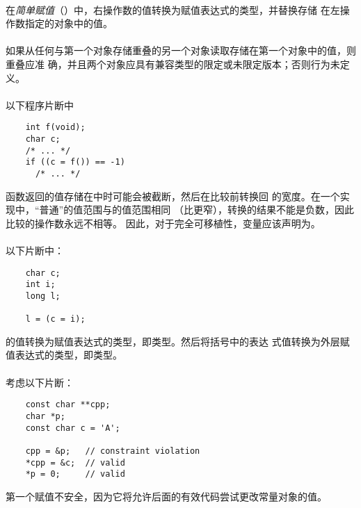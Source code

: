 \semantic
\paragraph{}
在\textit{简单赋值}（\tm{=}）中，右操作数的值转换为赋值表达式的类型，并替换存储
在左操作数指定的对象中的值。

\paragraph{}
如果从任何与第一个对象存储重叠的另一个对象读取存储在第一个对象中的值，则重叠应准
确，并且两个对象应具有兼容类型的限定或未限定版本；否则行为未定义。

\paragraph{}
\ex 以下程序片断中
\begin{lstlisting}
    int f(void);
    char c;
    /* ... */
    if ((c = f()) == -1)
      /* ... */
\end{lstlisting}
函数返回的值存储在中时可能会被截断，然后在比较前转换回
的宽度。在一个实现中，``普通''的值范围与的值范围相同
（比更窄），转换的结果不能是负数，因此比较的操作数永远不相等。
因此，对于完全可移植性，变量应该声明为。

\paragraph{}
\ex 以下片断中：
\begin{lstlisting}
    char c;
    int i;
    long l;

    l = (c = i);
\end{lstlisting}
的值转换为赋值表达式的类型，即类型。然后将括号中的表达
式值转换为外层赋值表达式的类型，即类型。

\paragraph{}
\ex 考虑以下片断：
\begin{lstlisting}
    const char **cpp;
    char *p;
    const char c = 'A';

    cpp = &p;   // constraint violation
    *cpp = &c;  // valid
    *p = 0;     // valid
\end{lstlisting}
第一个赋值不安全，因为它将允许后面的有效代码尝试更改常量对象的值。

